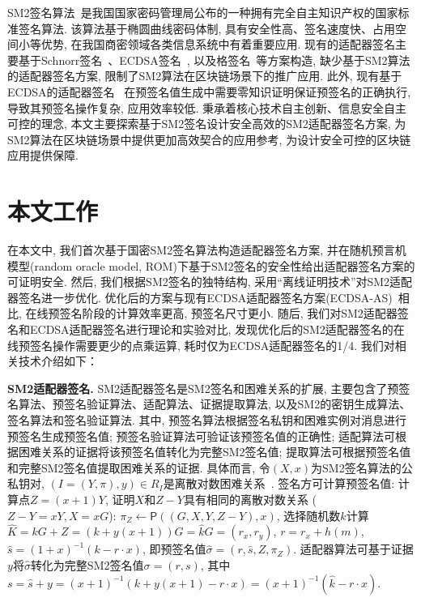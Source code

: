 \documentclass[review]{jcr}
\begin{document}
SM2签名算法~\cite{SM2,SM2-survey}是我国国家密码管理局公布的一种拥有完全自主知识产权的国家标准签名算法. 该算法基于椭圆曲线密码体制, 具有安全性高、签名速度快、占用空间小等优势, 在我国商密领域各类信息系统中有着重要应用. 现有的适配器签名主要基于Schnorr签名~\cite{Sch89,Poelstra2016,AumayrEEFHMMR20,ErwigFHMR2021}、ECDSA签名~\cite{ECDSA,rfc6605,AumayrEEFHMMR20,PA18}, 以及格签名~\cite{DucasLLSSS2018,EsginEE20}等方案构造, 缺少基于SM2算法的适配器签名方案, 限制了SM2算法在区块链场景下的推广应用. 此外, 现有基于ECDSA的适配器签名~\cite{AumayrEEFHMMR20} 在预签名值生成中需要零知识证明保证预签名的正确执行, 导致其预签名操作复杂, 应用效率较低. 秉承着核心技术自主创新、信息安全自主可控的理念, 本文主要探索基于SM2签名设计安全高效的SM2适配器签名方案, 为SM2算法在区块链场景中提供更加高效契合的应用参考, 为设计安全可控的区块链应用提供保障. 


\section{本文工作}  

在本文中, 我们首次基于国密SM2签名算法构造适配器签名方案, 并在随机预言机模型(random oracle model, ROM)下基于SM2签名的安全性给出适配器签名方案的可证明安全. 然后, 我们根据SM2签名的独特结构, 采用``离线证明技术''对SM2适配器签名进一步优化. 优化后的方案与现有ECDSA适配器签名方案(ECDSA-AS)~\cite{AumayrEEFHMMR20}相比, 在线预签名阶段的计算效率更高, 预签名尺寸更小. 随后, 我们对SM2适配器签名和ECDSA适配器签名进行理论和实验对比, 发现优化后的SM2适配器签名的在线预签名操作需要更少的点乘运算, 耗时仅为ECDSA适配器签名的1/4. 我们对相关技术介绍如下：

\begin{trivlist}
\item \textbf{SM2适配器签名.} SM2适配器签名是SM2签名和困难关系的扩展, 主要包含了预签名算法、预签名验证算法、适配算法、证据提取算法, 以及SM2的密钥生成算法、签名算法和签名验证算法. 其中, 预签名算法根据签名私钥和困难实例对消息进行预签名生成预签名值; 预签名验证算法可验证该预签名值的正确性; 适配算法可根据困难关系的证据将该预签名值转化为完整SM2签名值; 提取算法可根据预签名值和完整SM2签名值提取困难关系的证据. 具体而言, 令$(X,x)$为SM2签名算法的公私钥对, $(I=(Y,\pi),y)\in R_I$是离散对数困难关系~\cite{AumayrEEFHMMR20}. 签名方可计算预签名值: 计算点$Z=(x+1)Y$, 证明$X$和$Z-Y$具有相同的离散对数关系 ($Z-Y=xY, X=xG$): $\pi_Z\leftarrow \mathsf{P}((G,X,Y,Z-Y),x)$, 选择随机数$k$计算$\hat{K}=kG+Z=(k+y(x+1))G=\hat{k}G=(r_x,r_y)$, $r=r_x+h(m)$, $\hat{s}=(1+x)^{-1}(k-r\cdot x)$, 即预签名值$\hat{\sigma}=(r,\hat{s},Z,\pi_Z)$. 适配器算法可基于证据$y$将$\hat{\sigma}$转化为完整SM2签名值$\sigma=(r,s)$, 其中$s=\hat{s}+y=(x+1)^{-1}(k+y(x+1)-r\cdot x)=(x+1)^{-1}(\hat{k}-r\cdot x)$. 
\end{trivlist}
\end{document}
